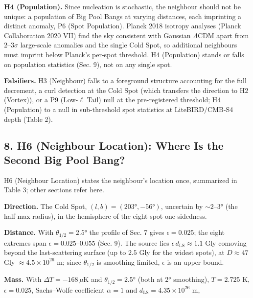 \documentclass[
]{article}
\begin{document}
\textbf{H4 (Population).} Since nucleation is stochastic, the neighbour
should not be unique: a population of Big Pool Bangs at varying
distances, each imprinting a distinct anomaly, P6 (Spot Population).
Planck 2018 isotropy analyses (Planck Collaboration 2020 VII) find the
sky consistent with Gaussian \(\Lambda\)CDM apart from
\(2\)--\(3\sigma\) large-scale anomalies and the single Cold Spot, so
additional neighbours must imprint below Planck's per-spot threshold. H4
(Population) stands or falls on population statistics (Sec. 9), not on
any single spot.

\textbf{Falsifiers.} H3 (Neighbour) falls to a foreground structure
accounting for the full decrement, a curl detection at the Cold Spot
(which transfers the direction to H2 (Vortex)), or a P9 (Low-\(\ell\)
Tail) null at the pre-registered threshold; H4 (Population) to a null in
sub-threshold spot statistics at LiteBIRD/CMB-S4 depth (Table 2).

\hypertarget{h6-neighbour-location-where-is-the-second-big-pool-bang}{%
\subsection{\texorpdfstring{\textbf{8. H6 (Neighbour Location): Where Is
the Second Big Pool
Bang?}}{8. H6 (Neighbour Location): Where Is the Second Big Pool Bang?}}\label{h6-neighbour-location-where-is-the-second-big-pool-bang}}

H6 (Neighbour Location) states the neighbour's location once, summarized
in Table 3; other sections refer here.

\textbf{Direction.} The Cold Spot, \((l, b) = (203°, -56°)\), uncertain
by \(\sim\!2\)--\(3°\) (the half-max radius), in the hemisphere of the
eight-spot one-sidedness.

\textbf{Distance.} With \(\theta_{1/2} = 2.5°\) the profile of Sec. 7
gives \(\epsilon = 0.025\); the eight extremes span
\(\epsilon = 0.025\)--\(0.055\) (Sec. 9). The source lies
\(\epsilon\,d_{\text{LS}} \approx 1.1\) Gly comoving beyond the
last-scattering surface (up to \(2.5\) Gly for the widest spots), at
\(D \approx 47\) Gly \(\approx 4.5\times10^{26}\) m; since
\(\theta_{1/2}\) is smoothing-limited, \(\epsilon\) is an upper bound.

\textbf{Mass.} With \(\Delta T = -168\,\mu\)K and
\(\theta_{1/2} = 2.5°\) (both at \(2°\) smoothing), \(T = 2.725\) K,
\(\epsilon = 0.025\), Sachs--Wolfe coefficient \(\alpha = 1\) and
\(d_{\text{LS}} = 4.35\times10^{26}\) m,
\end{document}
